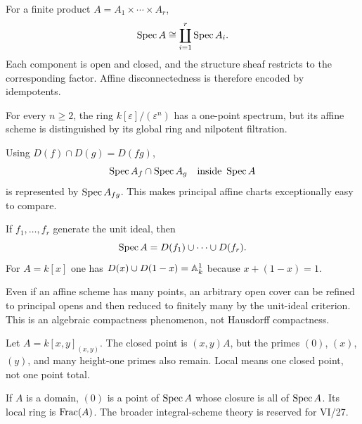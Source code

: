 \begin{example}
For a finite product $A=A_1\times\cdots\times A_r$,
\[
\operatorname{Spec} A\cong\coprod_{i=1}^r\operatorname{Spec} A_i.
\]
Each component is open and closed, and the structure sheaf restricts to the corresponding
factor.  Affine disconnectedness is therefore encoded by idempotents.
\end{example}

\begin{example}
For every $n\ge2$, the ring $k[\varepsilon]/(\varepsilon^n)$ has a one-point spectrum, but
its affine scheme is distinguished by its global ring and nilpotent filtration.
\end{example}

\begin{example}
Using $D(f)\cap D(g)=D(fg)$,
\[
\operatorname{Spec} A_f\cap\operatorname{Spec} A_g\quad\text{inside }\operatorname{Spec} A
\]
is represented by $\operatorname{Spec} A_{fg}$.  This makes principal affine charts exceptionally easy
to compare.
\end{example}

\begin{example}
If $f_1,\dots,f_r$ generate the unit ideal, then
\[
\operatorname{Spec} A=D(f_1)\cup\cdots\cup D(f_r).
\]
For $A=k[x]$ one has $D(x)\cup D(1-x)=\mathbb A^1_k$ because $x+(1-x)=1$.
\end{example}

\begin{example}
Even if an affine scheme has many points, an arbitrary open cover can be refined to
principal opens and then reduced to finitely many by the unit-ideal criterion.  This is an
algebraic compactness phenomenon, not Hausdorff compactness.
\end{example}

\begin{example}
Let $A=k[x,y]_{(x,y)}$.  The closed point is $(x,y)A$, but the primes $(0)$, $(x)$, $(y)$,
and many height-one primes also remain.  Local means one closed point, not one point total.
\end{example}

\begin{example}
If $A$ is a domain, $(0)$ is a point of $\operatorname{Spec} A$ whose closure is all of $\operatorname{Spec} A$.  Its
local ring is $\operatorname{Frac}(A)$.  The broader integral-scheme theory is reserved for VI/27.
\end{example}

